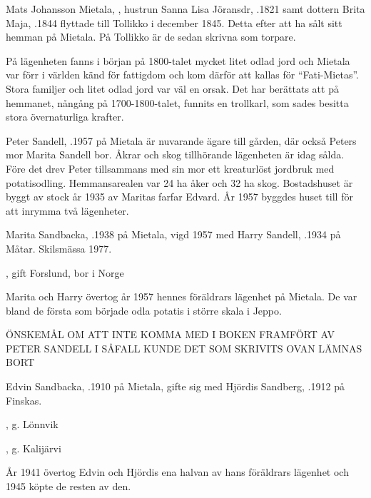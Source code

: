 Mats Johansson Mietala, , hustrun Sanna Lisa Jöransdr, .1821 samt dottern Brita Maja,  .1844 flyttade till Tollikko i december 1845. Detta efter att ha sålt sitt hemman på Mietala. På Tollikko är de sedan skrivna som torpare.

På lägenheten fanns i början på 1800-talet mycket litet odlad jord och Mietala var förr i världen känd för fattigdom och kom därför att kallas för ``Fati-Mietas''. Stora familjer och litet odlad jord var väl en orsak. Det har berättats att på hemmanet, nångång på 1700-1800-talet, funnits en trollkarl, som sades besitta stora övernaturliga krafter.




Peter Sandell, .1957 på Mietala är nuvarande ägare till gården, där också Peters mor Marita Sandell bor. Åkrar och skog tillhörande lägenheten är idag sålda. Före det drev Peter tillsammans med sin mor ett kreaturlöst jordbruk med potatisodling. Hemmansarealen var 24 ha åker och 32 ha skog. Bostadshuset är byggt av stock år 1935 av Maritas farfar Edvard. År 1957 byggdes huset till för att inrymma två lägenheter.

Marita  Sandbacka, .1938 på Mietala, vigd 1957 med Harry Sandell, .1934 på Måtar. Skilsmässa 1977.
\begin{jhchildren}
  \item {}
  \item {}, gift Forslund, bor i Norge
\end{jhchildren}
Marita och Harry övertog år 1957 hennes föräldrars lägenhet på Mietala. De var bland de första som började odla potatis i större skala i Jeppo.

ÖNSKEMÅL OM ATT INTE KOMMA MED I BOKEN FRAMFÖRT AV PETER SANDELL I SÅFALL KUNDE  DET SOM SKRIVITS OVAN LÄMNAS BORT

Edvin Sandbacka, .1910 på Mietala, gifte sig med Hjördis Sandberg, .1912 på Finskas.
\begin{jhchildren}
  \item {}, g. Lönnvik
  \item {}
  \item {}, g. Kalijärvi
\end{jhchildren}
År 1941 övertog Edvin och Hjördis ena halvan av hans föräldrars lägenhet och 1945 köpte de resten av den.

